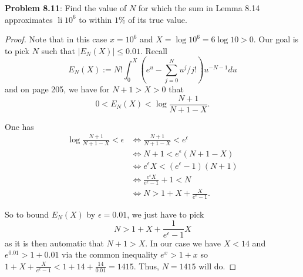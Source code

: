 \documentclass[12pt]{article}
\DeclareMathOperator{\li}{li}
\begin{document}
\fi

\textbf{Problem 8.11}: Find the value of $N$ for which the sum in Lemma 8.14 approximates $\li 10^6$ to within $1\%$ of its true value.

\begin{proof}
Note that in this case $x = 10^6$ and $X = \log 10^6 = 6 \log 10 > 0$. Our goal is to pick $N$ such that $|E_N(X)| \leq 0.01$. Recall
$$E_N(X) := N! \int_0^X \left(e^u - \sum_{j = 0}^N u^j/j!\right) u^{-N-1} du$$
and on page 205, we have for $N + 1 > X > 0$ that
$$0 < E_N(X) < \log \frac{N + 1}{N + 1 - X}.$$

One has
\begin{align*}
\log \frac{N + 1}{N + 1 - X} < \epsilon &\iff \frac{N + 1}{N + 1 - X} < e^\epsilon\\
&\iff N + 1 < e^\epsilon(N + 1 - X)\\
&\iff e^\epsilon X < (e^\epsilon - 1) (N + 1)\\
&\iff \frac{e^\epsilon X}{e^\epsilon - 1} + 1 < N\\
&\iff N > 1 + X + \frac{X}{e^\epsilon - 1}.
\end{align*}

So to bound $E_N(X)$ by $\epsilon = 0.01$, we just have to pick 
$$N > 1 + X + \frac{1}{e^\epsilon - 1} X$$
as it is then automatic that $N + 1 > X$. In our case we have $X < 14$ and $e^{0.01} > 1 + 0.01$ via the common inequality $e^x > 1 + x$ so $1 + X + \frac{X}{e^\epsilon - 1} < 1 + 14 + \frac{14}{0.01} = 1415$. Thus, $N = 1415$ will do.
\end{proof}

\unless\ifdefined\IsMainDocument
\end{document}
